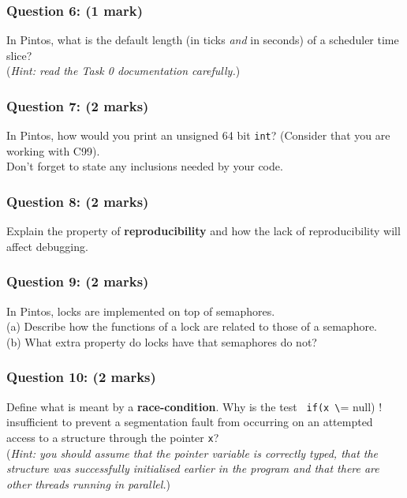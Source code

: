 \documentclass[a4paper,12pt]{article}
\newcommand{\shell}[1]{\lstinline!#1!}
\begin{document}
\subsubsection*{Question 6: (1 mark)} \vspace{-0.1em}
In Pintos, what is the default length (in ticks \emph{and} in seconds) of a scheduler time slice? \\
(\textit{Hint: read the Task 0 documentation carefully.})

\subsubsection*{Question 7: (2 marks)} \vspace{-0.1em}
In Pintos, how would you print an unsigned 64 bit \shell{int}? 
(Consider that you are working with C99). \\
Don't forget to state any inclusions needed by your code.

\subsubsection*{Question 8: (2 marks)} \vspace{-0.1em}
Explain the property of {\bf reproducibility} and how the lack of reproducibility will affect debugging.

\subsubsection*{Question 9: (2 marks)} \vspace{-0.1em}
In Pintos, locks are implemented on top of semaphores.\\
(a) Describe how the functions of a lock are related to those of a semaphore.\\
(b) What extra property do locks have that semaphores do not?

\subsubsection*{Question 10: (2 marks)} \vspace{-0.1em}
Define what is meant by a {\bf race-condition}. Why is the test \shell{ if(x \!= null) } 
insufficient to prevent a segmentation fault from occurring on an attempted access to a structure through the pointer \shell{x}?\\
(\textit{Hint: you should assume that the pointer variable is correctly typed, that the structure was successfully initialised earlier in the program 
and that there are other threads running in parallel.})
\end{document}
